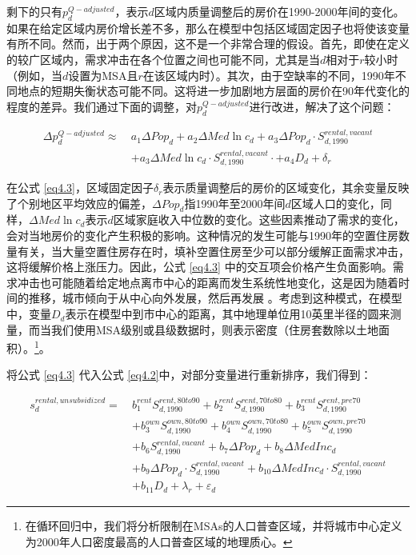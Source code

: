 \documentclass[lang=cn,11pt,a4paper]{paper}
\begin{document}
剩下的只有$p_{d}^{Q-adjusted}$，表示$d$区域内质量调整后的房价在1990-2000年间的变化。如果在给定区域内房价增长差不多，那么在模型中包括区域固定因子也将使该变量有所不同。然而，出于两个原因，这不是一个非常合理的假设。首先，即使在定义的较广区域内，需求冲击在各个位置之间也可能不同，尤其是当$d$相对于$r$较小时（例如，当$d$设置为MSA且$r$在该区域内时）。其次，由于空缺率的不同，1990年不同地点的短期失衡状态可能不同。这将进一步加剧地方层面的房价在90年代变化的程度的差异。我们通过下面的调整，对$p_{d}^{Q-adjusted}$进行改进，解决了这个问题：

\begin{equation}\label{eq4.3}
  \begin{aligned}
    \Delta p_{d}^{Q-adjusted} \approx \ & a_{1} \Delta Pop_{d}+a_{2} \Delta Med \ln c_{d}+a_{3} \Delta P o p_{d} \cdot S_{d, 1990}^{rental,vacant} \\
    &+a_{3} \Delta M e d \ln c_{d} \cdot S_{d, 1990}^{rental,vacant} \cdot+a_{4} D_{d}+\delta_{r}
    \end{aligned}
\end{equation}
\vspace{2pt}

在公式 \eqref{eq4.3}，区域固定因子$\delta_{r}$表示质量调整后的房价的区域变化，其余变量反映了个别地区平均效应的偏差，$\Delta Pop_{d}$指1990年至2000年间$d$区域人口的变化，同样，$\Delta Med \ln c_{d}$表示$d$区域家庭收入中位数的变化。这些因素推动了需求的变化，会对当地房价的变化产生积极的影响。这种情况的发生可能与1990年的空置住房数量有关，当大量空置住房存在时，填补空置住房至少可以部分缓解正面需求冲击，这将缓解价格上涨压力。因此，公式 \eqref{eq4.3} 中的交互项会价格产生负面影响。需求冲击也可能随着给定地点离市中心的距离而发生系统性地变化，这是因为随着时间的推移，城市倾向于从中心向外发展，然后再发展 \cite{Brueckner2009725}。考虑到这种模式，在模型中，变量$D_d$表示在模型中到市中心的距离，其中地理单位用10英里半径的圆来测量，而当我们使用MSA级别或县级数据时，则表示密度（住房套数除以土地面积）。\!\footnote{在循环回归中，我们将分析限制在MSAs的人口普查区域，并将城市中心定义为2000年人口密度最高的人口普查区域的地理质心。}。

将公式 \eqref{eq4.3} 代入公式 \eqref{eq4.2}中，对部分变量进行重新排序，我们得到：

\begin{equation}\label{eq4.4}
  \begin{aligned}
    s_{d}^{rental, unsubsidized}=\ & b_{1}^{rent} S_{d, 1990}^{rent, 80 t o 90}+b_{2}^{rent} S_{d, 1990}^{rent, 70 t o 80}+b_{3}^{rent} S_{d, 1990}^{rent, p r e 70} \\
    &+b_{3}^{own} S_{d, 1990}^{own, 80 t o 90}+b_{4}^{own} S_{d, 1990}^{own, 70 t o 80}+b_{5}^{own} S_{d, 1990}^{own, p r e 70} \\
    &+b_{6} S_{d, 1990}^{rent a l, vacant}+b_{7} \Delta P o p_{d}+b_{8} \Delta MedInc_{d} \\
    &+b_{9} \Delta Po p_{d} \cdot S_{d, 1990}^{rental, vacant}+b_{10} \Delta MedInc_{d} \cdot S_{d, 1990}^{rent a l, vacant} \\
    &+b_{11} D_{d}+\lambda_{r}+\varepsilon_{d}
    \end{aligned}
\end{equation}
\vspace{2pt}
\end{document}
